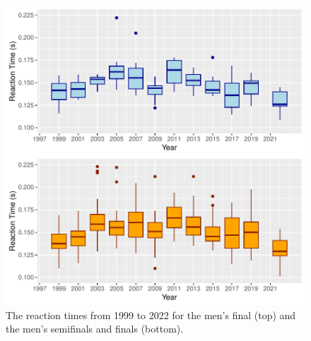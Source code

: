 \documentclass[12pt, letterpaper, titlepage]{article}
\begin{document}
\begin{figure}[tbp]
  \centering
  \includegraphics{Finals_Pooled_Boxplot}
  \caption{The reaction times from 1999 to 2022 for the men's final (top) and
  the men's semifinals and finals (bottom).}
  \label{fig:Boxplots}
\end{figure}
\end{document}
